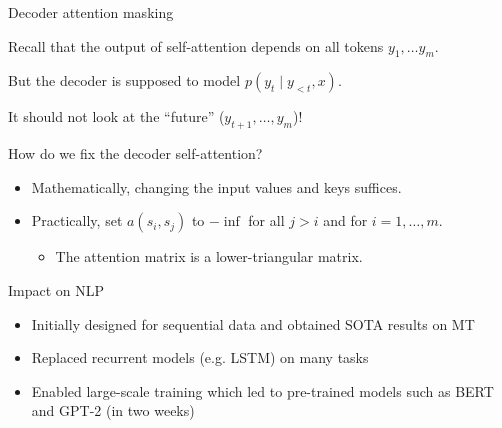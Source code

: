\documentclass[usenames,dvipsnames,notes,11pt,aspectratio=169,hyperref={colorlinks=true, linkcolor=blue}]{beamer}
\begin{document}
\begin{frame}
    {Decoder attention masking}

    Recall that the output of self-attention depends on all tokens $y_1,\ldots y_m$.

    But the decoder is supposed to model $p(y_t\mid y_{<t}, x)$.

    It should not look at the ``future'' ($y_{t+1},\ldots,y_m$)!

    \pause
    How do we fix the decoder self-attention?\\
    \begin{itemize}
        \item Mathematically, changing the input values and keys suffices.
        \item Practically, set $a(s_i, s_j)$ to $-\inf$ for all $j>i$ and for $i=1,\ldots,m$.
            \begin{itemize}
                \item The attention matrix is a lower-triangular matrix.
            \end{itemize}
    \end{itemize}
\end{frame}

\begin{frame}
    {Impact on NLP}
    \begin{itemize}
        \item Initially designed for sequential data and obtained SOTA results on MT
        \item Replaced recurrent models (e.g. LSTM) on many tasks
        \item Enabled large-scale training which led to pre-trained models such as BERT and GPT-2 (in two weeks)
    \end{itemize}
\end{frame}
\end{document}

